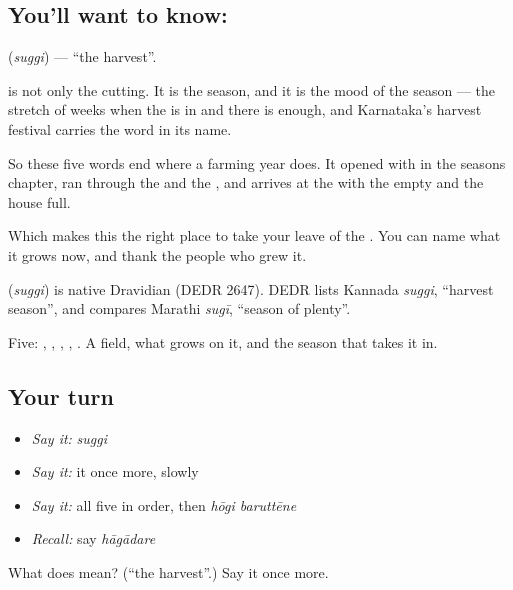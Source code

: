 \subsection*{You'll want to know: }
\textbf{} (\emph{suggi}) — \textquotedblleft{}the harvest\textquotedblright{}.

 is not only the cutting. It is the season, and it is the mood of the season — the stretch of weeks when the  is in and there is enough, and Karnataka's harvest festival carries the word in its name.

So these five words end where a farming year does. It opened with  in the seasons chapter, ran through the  and the , and arrives at the  with the  empty and the house full.

Which makes this the right place to take your leave of the . You can name what it grows now, and thank the people who grew it.

\begin{cousinweb}
\textbf{} (\emph{suggi}) is native Dravidian (DEDR 2647). DEDR lists Kannada \emph{suggi}, \textquotedblleft{}harvest season\textquotedblright{}, and compares Marathi \emph{sugī}, \textquotedblleft{}season of plenty\textquotedblright{}.
\end{cousinweb}

\begin{grammarlens}[title={What you've built}]
Five: , , , , . A field, what grows on it, and the season that takes it in.
\end{grammarlens}

\subsection*{Your turn}
\begin{itemize}
\raggedright
  \item \emph{Say it:} \emph{suggi}
  \item \emph{Say it:} it once more, slowly
  \item \emph{Say it:} all five in order, then \emph{hōgi baruttēne}
  \item \emph{Recall:} say \emph{hāgādare}
\end{itemize}

\begin{tcolorbox}[breakable,colback=teal!4,colframe=teal!35!black,title={Before you move on}]
What does  mean? (\textquotedblleft{}the harvest\textquotedblright{}.) Say it once more.
\end{tcolorbox}
